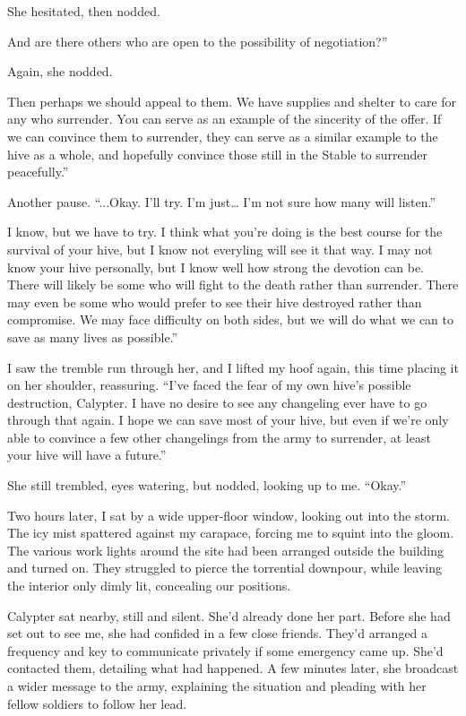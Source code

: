 She hesitated, then nodded.

\leavevmode{}And are there others who are open to the possibility of negotiation?”

Again, she nodded.

\leavevmode{}Then perhaps we should appeal to them. We have supplies and shelter to care for any who surrender. You can serve as an example of the sincerity of the offer. If we can convince them to surrender, they can serve as a similar example to the hive as a whole, and hopefully convince those still in the Stable to surrender peacefully.”

Another pause. “...Okay. I’ll try. I’m just… I’m not sure how many will listen.”

\leavevmode{}I know, but we have to try. I think what you’re doing is the best course for the survival of your hive, but I know not everyling will see it that way. I may not know your hive personally, but I know well how strong the devotion can be. There will likely be some who will fight to the death rather than surrender. There may even be some who would prefer to see their hive destroyed rather than compromise. We may face difficulty on both sides, but we will do what we can to save as many lives as possible.”

I saw the tremble run through her, and I lifted my hoof again, this time placing it on her shoulder, reassuring. “I’ve faced the fear of my own hive’s possible destruction, Calypter. I have no desire to see any changeling ever have to go through that again. I hope we can save most of your hive, but even if we’re only able to convince a few other changelings from the army to surrender, at least your hive will have a future.”

She still trembled, eyes watering, but nodded, looking up to me. “Okay.”

{\br}%
Two hours later, I sat by a wide upper-floor window, looking out into the storm. The icy mist spattered against my carapace, forcing me to squint into the gloom. The various work lights around the site had been arranged outside the building and turned on. They struggled to pierce the torrential downpour, while leaving the interior only dimly lit, concealing our positions.

Calypter sat nearby, still and silent. She’d already done her part. Before she had set out to see me, she had confided in a few close friends. They’d arranged a frequency and key to communicate privately if some emergency came up. She’d contacted them, detailing what had happened. A few minutes later, she broadcast a wider message to the army, explaining the situation and pleading with her fellow soldiers to follow her lead.

